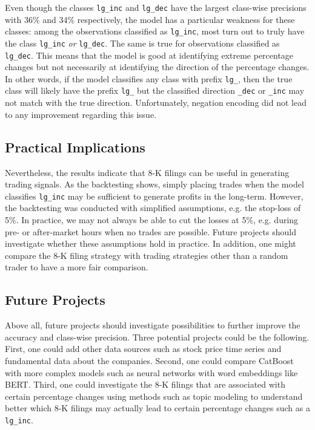 \documentclass{article}
\begin{document}
	Even though the classes \lstinline{lg_inc} and \lstinline{lg_dec} have the largest class-wise precisions with 36\% and 34\% respectively, the model has a particular weakness for these classes: among the observations classified as \lstinline{lg_inc}, most turn out to truly have the class \lstinline{lg_inc} \textit{or} \lstinline{lg_dec}. The same is true for observations classified as \lstinline{lg_dec}. This means that the model is good at identifying extreme percentage changes but not necessarily at identifying the direction of the percentage changes. In other words, if the model classifies any class with prefix \lstinline{lg_}, then the true class will likely have the prefix \lstinline{lg_} but the classified direction \lstinline{_dec} or \lstinline{_inc} may not match with the true direction. Unfortunately, negation encoding did not lead to any improvement regarding this issue.
	
	
	\subsection{Practical Implications}
	
	Nevertheless, the results indicate that 8-K filings can be useful in generating trading signals. As the backtesting shows, simply placing trades when the model classifies \lstinline{lg_inc} may be sufficient to generate profits in the long-term. However, the backtesting was conducted with simplified assumptions, e.g. the stop-loss of 5\%. In practice, we may not always be able to cut the losses at 5\%, e.g. during pre- or after-market hours when no trades are possible. Future projects should investigate whether these assumptions hold in practice. In addition, one might compare the 8-K filing strategy with trading strategies other than a random trader to have a more fair comparison.
	
	\subsection{Future Projects}
		
	Above all, future projects should investigate possibilities to further improve the accuracy and class-wise precision. Three potential projects could be the following. First, one could add other data sources such as stock price time series and fundamental data about the companies. Second, one could compare CatBoost with more complex models such as neural networks with word embeddings like BERT. Third, one could investigate the 8-K filings that are associated with certain percentage changes using methods such as topic modeling to understand better which 8-K filings may actually lead to certain percentage changes such as a \lstinline{lg_inc}.
	
\end{document}
